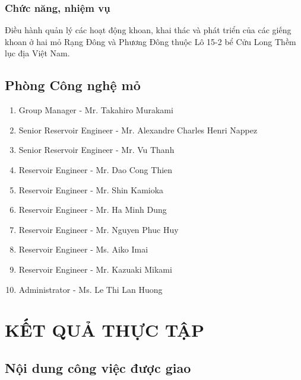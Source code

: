 \documentclass[12pt,a4paper]{report}
\begin{document}
\subsection{Chức năng, nhiệm vụ}
Điều hành quản lý các hoạt động khoan, khai thác và phát triển của các giếng khoan ở hai mỏ Rạng Đông và Phương Đông thuộc Lô 15-2 bể Cửu Long Thềm lục địa Việt Nam.
\section{Phòng Công nghệ mỏ}
	\begin{enumerate}
    	\item Group Manager - Mr. Takahiro Murakami
        \item Senior Reservoir Engineer - Mr. Alexandre Charles Henri Nappez
        \item Senior Reservoir Engineer - Mr. Vu Thanh
        \item Reservoir Engineer - Mr. Dao Cong Thien
        \item Reservoir Engineer - Mr. Shin Kamioka
        \item Reservoir Engineer - Mr. Ha Minh Dung
        \item Reservoir Engineer - Mr. Nguyen Phuc Huy
        \item Reservoir Engineer - Ms. Aiko Imai
        \item Reservoir Engineer - Mr. Kazuaki Mikami
        \item Administrator - Ms. Le Thi Lan Huong
    \end{enumerate}

\chapter{KẾT QUẢ THỰC TẬP}
\section{Nội dung công việc được giao}
\end{document}
